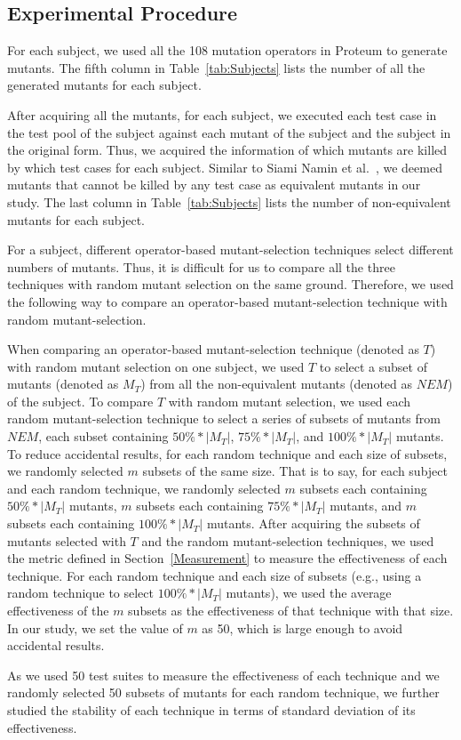 \vspace{-1ex}
\subsection{Experimental Procedure}
\label{Procedure}

For each subject, we used all the 108 mutation operators in
Proteum to generate mutants. The fifth column in
Table~\ref{tab:Subjects} lists the number of all the generated
mutants for each subject.

After acquiring all the mutants, for each subject, we executed
each test case in the test pool of the subject against each mutant
of the subject and the subject in the original form. Thus, we
acquired the information of which mutants are killed by which test
cases for each subject. Similar to Siami Namin et
al.~\cite{SiamiNamin:08}, we deemed mutants that cannot be killed
by any test case as equivalent mutants in our study. The last
column in Table~\ref{tab:Subjects} lists the number of
non-equivalent mutants for each subject.

For a subject, different operator-based mutant-selection
techniques select different numbers of mutants. Thus, it is
difficult for us to compare all the three techniques with random
mutant selection on the same ground. Therefore, we used the
following way to compare an operator-based mutant-selection
technique with random mutant-selection.

When comparing an operator-based mutant-selection technique
(denoted as $T$) with random mutant selection on one subject, we
used $T$ to select a subset of mutants (denoted as $M_T$) from all
the non-equivalent mutants (denoted as $NEM$) of the subject. To
compare $T$ with random mutant selection, we used each random
mutant-selection technique to select a series of subsets of
mutants from $NEM$, each subset containing $50\%*|M_T|$,
$75\%*|M_T|$, and $100\%*|M_T|$ mutants. To reduce accidental
results, for each random technique and each size of subsets, we
randomly selected $m$ subsets of the same size. That is to say,
for each subject and each random technique, we randomly selected
$m$ subsets each containing $50\%*|M_T|$ mutants, $m$ subsets each
containing $75\%*|M_T|$ mutants, and $m$ subsets each containing
$100\%*|M_T|$ mutants. After acquiring the subsets of mutants
selected with $T$ and the random mutant-selection techniques, we
used the metric defined in Section~\ref{Measurement} to measure
the effectiveness of each technique. For each random technique and
each size of subsets (e.g., using a random technique to select
$100\%*|M_T|$ mutants), we used the average effectiveness of the
$m$ subsets as the effectiveness of that technique with that size.
In our study, we set the value of $m$ as 50, which is large enough
to avoid accidental results.

As we used 50 test suites to measure the effectiveness of each
technique and we randomly selected 50 subsets of mutants for each
random technique, we further studied the stability of each
technique in terms of standard deviation of its effectiveness.
